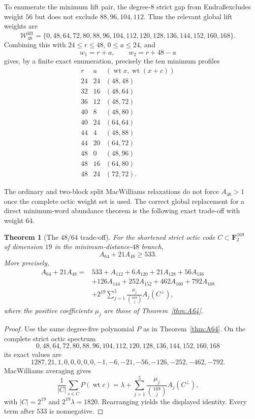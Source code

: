 \documentclass[11pt,reqno]{amsart}
\newtheorem{theorem}{Theorem}[section]
\theoremstyle{remark}
\newcommand{\F}{\mathbf F}
\newcommand{\wt}{\operatorname{wt}}
\begin{document}
To enumerate the minimum lift pair, the degree-$8$ strict gap from Endra\ss excludes weight $56$ but does not exclude $88,96,104,112$.  Thus the relevant global lift weights are
\[
\mathcal W_{48}^{\mathrm{lift}}
=\{0,48,64,72,80,88,96,104,112,120,128,136,144,152,160,168\}.
\]
Combining this with $24\le r\le48$, $0\le a\le24$, and
\[
w_1=r+a,\qquad w_2=r+48-a
\]
gives, by a finite exact enumeration, precisely the ten minimum profiles
\[
\begin{array}{c|c|c}
r&a&(\wt x,\wt(x+c))\\\hline
24&24&(48,48)\\
32&16&(48,64)\\
36&12&(48,72)\\
40&8&(48,80)\\
40&24&(64,64)\\
44&4&(48,88)\\
44&20&(64,72)\\
48&0&(48,96)\\
48&16&(64,80)\\
48&24&(72,72).
\end{array}
\]

The ordinary and two-block split MacWilliams relaxations do not force $A_{48}>1$ once the complete octic weight set is used.  The correct global replacement for a direct minimum-word abundance theorem is the following exact trade-off with weight $64$.

\begin{theorem}[The $48/64$ trade-off]\label{thm:trade4864}
For the shortened strict octic code $C\subset\F_2^{169}$ of dimension $19$ in the minimum-distance-$48$ branch,
\[
\boxed{A_{64}+21A_{48}\ge533.}
\]
More precisely,
\[
\begin{aligned}
A_{64}+21A_{48}
={}&533+A_{112}+6A_{120}+21A_{128}+56A_{136}\\
&+126A_{144}+252A_{152}+462A_{160}+792A_{168}\\
&+2^{19}\sum_{j=1}^5
\frac{\mu_j}{\binom{169}{j}}A_j(C^\perp),
\end{aligned}
\]
where the positive coefficients $\mu_j$ are those of Theorem~\ref{thm:A64}.
\end{theorem}

\begin{proof}
Use the same degree-five polynomial $P$ as in Theorem~\ref{thm:A64}.  On the complete strict octic spectrum
\[
0,48,64,72,80,88,96,104,112,120,128,136,144,152,160,168
\]
its exact values are
\[
1287,21,1,0,0,0,0,0,-1,-6,-21,-56,-126,-252,-462,-792.
\]
MacWilliams averaging gives
\[
\frac1{|C|}\sum_{c\in C}P(\wt c)
=\lambda+\sum_{j=1}^5\frac{\mu_j}{\binom{169}{j}}A_j(C^\perp),
\]
with $|C|=2^{19}$ and $2^{19}\lambda=1820$.  Rearranging yields the displayed identity.  Every term after $533$ is nonnegative.
\end{proof}
\end{document}
